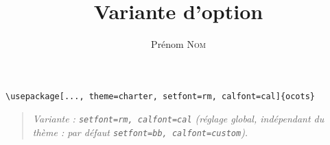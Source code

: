 \documentclass[11pt]{ocots-book}
\title{Variante d'option}
\author{Prénom \textsc{Nom}}
\newcommand{\ocotsvariantnote}[1]{\begin{quote}\itshape Variante : #1\end{quote}}
\begin{document}
\maketitle

\begin{lstlisting}
\usepackage[..., theme=charter, setfont=rm, calfont=cal]{ocots}
\end{lstlisting}
\ocotsvariantnote{\texttt{setfont=rm, calfont=cal} (r\'eglage global, ind\'ependant du th\`eme : par d\'efaut \texttt{setfont=bb, calfont=custom}).}

\end{document}
